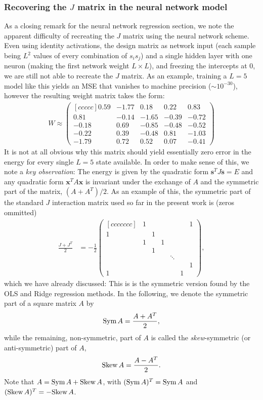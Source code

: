 \documentclass[a4paper, twocolumn]{article}
\newcommand{\pmat}[2]{\begin{pmatrix}[#1] #2 \end{pmatrix}}  %
\begin{document}
\subsubsection{Recovering the $J$ matrix in the neural network model}
As a closing remark for the neural network regression section, we note the apparent difficulty of recreating the $J$ matrix using the neural network scheme. Even using identity activations, the design matrix as network input (each sample being $L^2$ values of every combination of $s_is_j$) and a single hidden layer with one neuron (making the first network weight $L\times L$), and freezing the intercepts at $0$, we are still not able to recreate the $J$ matrix. As an example, training a $L=5$ model like this yields an MSE that vanishes to machine precision ($\sim10^{-30}$), however the resulting weight matrix takes the form:
\begin{align}
W\approx
\pmat{ccccc}{
 0.59 & -1.77 &  0.18 &  0.22 &  0.83 \\
 0.81 & -0.14 & -1.65 & -0.39 & -0.72 \\
-0.18 &  0.69 & -0.85 & -0.48 & -0.52 \\
-0.22 &  0.39 & -0.48 &  0.81 & -1.03 \\
-1.79 &  0.72 &  0.52 &  0.07 & -0.41
} \nonumber
\end{align}
It is not at all obvious why this matrix should yield essentially zero error in the energy for every single $L=5$ state available. In order to make sense of this, we note a \textit{key observation}: The energy is given by the quadratic form $\mathbf{s}^TJ\mathbf{s}=E$ and any quadratic form $\mathbf{x}^TA\mathbf{x}$ is invariant under the exchange of $A$ and the symmetric part of the matrix, $(A+A^T)/2$. As an example of this, the symmetric part of the standard $J$ interaction matrix used so far in the present work is (zeros ommitted)
\begin{align}
\frac{J+J^T}{2}&=-\frac{1}{2}\pmat{ccccccc}{
   & 1 &   &   &   &   &  1\\
 1 &   & 1 &   &   &   &   \\
   & 1 &   & 1 &   &   &   \\
   &   & 1 &   &   &   &   \\
   &   &   &   & \ddots & & \\
   &   &   &   &   &   & 1 \\
 1 &   &   &   &   & 1 &  
},\label{eq:symj}
\end{align}
which we have already discussed: This is is the symmetric version found by the OLS and Ridge regression methods. In the following, we denote the symmetric part of a square matrix $A$ by
\begin{align}
\text{Sym}\, A=\frac{A+A^T}{2},
\end{align}
while the remaining, non-symmetric, part of $A$ is called the \textit{skew}-symmetric (or anti-symmetric) part of $A$,
\begin{align}
\text{Skew}\, A=\frac{A-A^T}{2}.
\end{align}
Note that $A=\text{Sym}\, A+\text{Skew}\, A$, with $(\text{Sym}\, A)^T=\text{Sym}\, A$ and $(\text{Skew}\, A)^T=-\text{Skew}\, A$.
\end{document}
